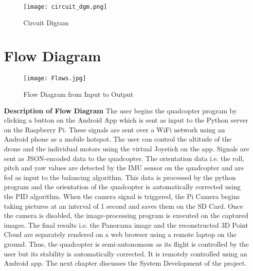\begin{figure}[H]
  \centering
  \texttt{[image: circuit\_dgm.png]}
  \caption{Circuit Digram}
  \label{circuit} 
\end{figure}


\section{Flow Diagram}
\begin{figure}[H]
  \centering
  \texttt{[image: Flows.jpg]}
  \caption{Flow Diagram from Input to Output}
  \label{Flow}	
\end{figure}

\textbf{Description of Flow Diagram}
\newline
The user begins the quadcopter program by clicking a button on the Android App which is sent as input to the Python server on the Raspberry Pi. These signals are sent over a WiFi network using an Android phone as a mobile hotspot. The user can control the altitude of the drone and the individual motors using the virtual Joystick on the app. Signals are sent as JSON-encoded data to the quadcopter. The orientation data i.e. the roll, pitch and yaw values are detected by the IMU sensor on the quadcopter and are fed as input to the balancing algorithm. This data is processed by the python program and the orientation of the quadcopter is automatically corrected using the PID algorithm. 
\newline
\newline
When the camera signal is triggered, the Pi Camera begins taking pictures at an interval of 1 second and saves them on the SD Card. Once the camera is disabled, the image-processing program is executed on the captured images. The final results i.e. the Panorama image and the reconstructed 3D Point Cloud are separately rendered on a web browser using a remote laptop on the ground. Thus, the quadcopter is semi-autonomous as its flight is controlled by the user but its stability is automatically corrected. It is remotely controlled using an Android app.
\newline
The next chapter discusses the System Development of the project.


